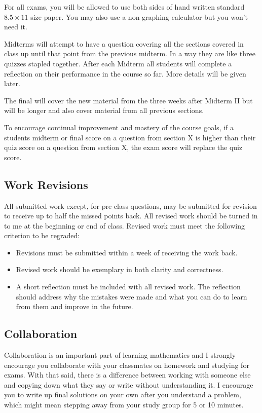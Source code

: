 \documentclass[11pt]{article}
\begin{document}
For all exams, you will be allowed to use both sides of hand written standard $8.5\times 11$ size paper. You may also use a non graphing calculator but you won't need it.

Midterms will attempt to have a question covering all the sections covered in class up until that point from the previous midterm. In a way they are like three quizzes stapled together. After each Midterm all students will complete a reflection on their performance in the course so far. More details will be given later.

The final will cover the new material from the three weeks after Midterm II but will be longer and also cover material from all previous sections.

To encourage continual improvement and mastery of the course goals, if a students midterm or final score on a question from section X is higher than their quiz score on a question from section X, the exam score will replace the quiz score.

\subsection*{Work Revisions}

All submitted work except, for pre-class questions, may be submitted for revision to receive up to half the missed points back. All revised work should be turned in to me at the beginning or end of class. Revised work must meet the following criterion to be regraded:
\begin{itemize}
    \item Revisions must be submitted within a week of receiving the work back.
    \item Revised work should be exemplary in both clarity and correctness.
    \item A short reflection must be included with all revised work. The reflection should address why the mistakes were made and what you can do to learn from them and improve in the future.
\end{itemize}

\subsection*{Collaboration}

Collaboration is an important part of learning mathematics and I strongly encourage you collaborate with your classmates on homework and studying for exams. With that said, there is a difference between working with someone else and copying down what they say or write without understanding it. I encourage you to write up final solutions on your own after you understand a problem, which might mean stepping away from your study group for 5 or 10 minutes.
\end{document}

